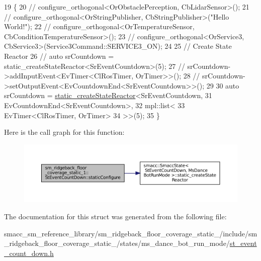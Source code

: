 \begin{DoxyCode}
19     \{
20         \textcolor{comment}{//   configure\_orthogonal<OrObstaclePerception, CbLidarSensor>();}
21         \textcolor{comment}{//   configure\_orthogonal<OrStringPublisher, CbStringPublisher>("Hello World!");}
22         \textcolor{comment}{//   configure\_orthogonal<OrTemperatureSensor, CbConditionTemperatureSensor>();}
23         \textcolor{comment}{//   configure\_orthogonal<OrService3, CbService3>(Service3Command::SERVICE3\_ON);      }
24         
25         \textcolor{comment}{// Create State Reactor}
26         \textcolor{comment}{// auto srCountdown = static\_createStateReactor<SrEventCountdown>(5);        }
27         \textcolor{comment}{// srCountdown->addInputEvent<EvTimer<ClRosTimer, OrTimer>>();}
28         \textcolor{comment}{// srCountdown->setOutputEvent<EvCountdownEnd<SrEventCountdown>>();}
29 
30         \textcolor{keyword}{auto} srCountdown = \hyperlink{classsmacc_1_1SmaccState_a892be704b48f93bf5c35635d1a58ed54}{static\_createStateReactor}<SrEventCountdown, 
31                                                          EvCountdownEnd<SrEventCountdown>, 
32                                                          mpl::list<
33                                                                   EvTimer<ClRosTimer, OrTimer>
34                                                                   >>(5);
35     \}
\end{DoxyCode}
Here is the call graph for this function\+:
\nopagebreak
\begin{figure}[H]
\begin{center}
\leavevmode
\includegraphics[width=350pt]{structsm__ridgeback__floor__coverage__static__1_1_1StEventCountDown_aef24befbf9c60e4f9c3e068d13c69728_cgraph}
\end{center}
\end{figure}


The documentation for this struct was generated from the following file\+:\begin{DoxyCompactItemize}
\item 
smacc\+\_\+sm\+\_\+reference\+\_\+library/sm\+\_\+ridgeback\+\_\+floor\+\_\+coverage\+\_\+static\+\_/include/sm\+\_\+ridgeback\+\_\+floor\+\_\+coverage\+\_\+static\+\_/states/ms\+\_\+dance\+\_\+bot\+\_\+run\+\_\+mode/\hyperlink{sm__ridgeback__floor__coverage__static__1_2include_2sm__ridgeback__floor__coverage__static__1_2s16d89a2211d1236fc346b6548483dfbf}{st\+\_\+event\+\_\+count\+\_\+down.\+h}\end{DoxyCompactItemize}
